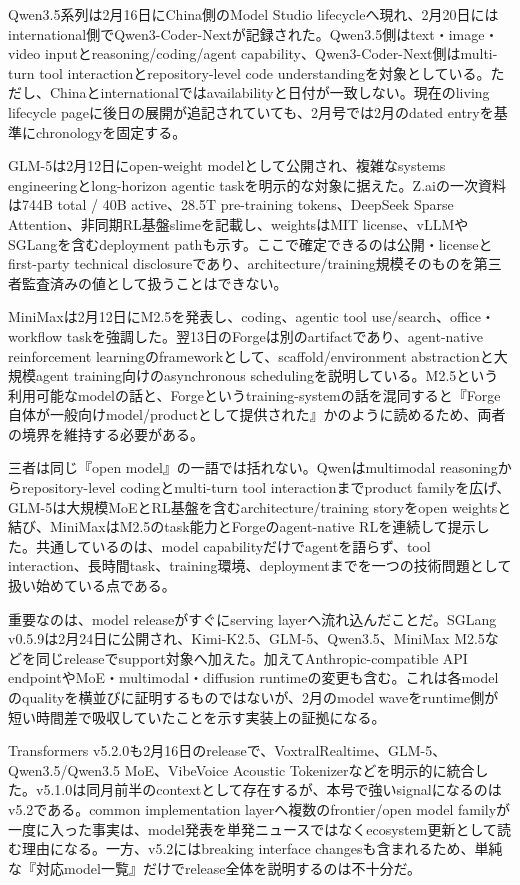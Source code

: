 Qwen3.5系列は2月16日にChina側のModel Studio lifecycleへ現れ、2月20日にはinternational側でQwen3-Coder-Nextが記録された。Qwen3.5側はtext・image・video inputとreasoning/coding/agent capability、Qwen3-Coder-Next側はmulti-turn tool interactionとrepository-level code understandingを対象としている。ただし、Chinaとinternationalではavailabilityと日付が一致しない。現在のliving lifecycle pageに後日の展開が追記されていても、2月号では2月のdated entryを基準にchronologyを固定する。\autocite{src-eac8dfbeb78c}


GLM-5は2月12日にopen-weight modelとして公開され、複雑なsystems engineeringとlong-horizon agentic taskを明示的な対象に据えた。Z.aiの一次資料は744B total / 40B active、28.5T pre-training tokens、DeepSeek Sparse Attention、非同期RL基盤slimeを記載し、weightsはMIT license、vLLMやSGLangを含むdeployment pathも示す。ここで確定できるのは公開・licenseとfirst-party technical disclosureであり、architecture/training規模そのものを第三者監査済みの値として扱うことはできない。\autocite{src-9156c37fb1c2}


MiniMaxは2月12日にM2.5を発表し、coding、agentic tool use/search、office・workflow taskを強調した。翌13日のForgeは別のartifactであり、agent-native reinforcement learningのframeworkとして、scaffold/environment abstractionと大規模agent training向けのasynchronous schedulingを説明している。M2.5という利用可能なmodelの話と、Forgeというtraining-systemの話を混同すると『Forge自体が一般向けmodel/productとして提供された』かのように読めるため、両者の境界を維持する必要がある。\autocite{src-d8e13386974c}


三者は同じ『open model』の一語では括れない。Qwenはmultimodal reasoningからrepository-level codingとmulti-turn tool interactionまでproduct familyを広げ、GLM-5は大規模MoEとRL基盤を含むarchitecture/training storyをopen weightsと結び、MiniMaxはM2.5のtask能力とForgeのagent-native RLを連続して提示した。共通しているのは、model capabilityだけでagentを語らず、tool interaction、長時間task、training環境、deploymentまでを一つの技術問題として扱い始めている点である。\autocite{src-9156c37fb1c2,src-d8e13386974c,src-eac8dfbeb78c}


重要なのは、model releaseがすぐにserving layerへ流れ込んだことだ。SGLang v0.5.9は2月24日に公開され、Kimi-K2.5、GLM-5、Qwen3.5、MiniMax M2.5などを同じreleaseでsupport対象へ加えた。加えてAnthropic-compatible API endpointやMoE・multimodal・diffusion runtimeの変更も含む。これは各modelのqualityを横並びに証明するものではないが、2月のmodel waveをruntime側が短い時間差で吸収していたことを示す実装上の証拠になる。\autocite{src-5bc0746a47c6}


Transformers v5.2.0も2月16日のreleaseで、VoxtralRealtime、GLM-5、Qwen3.5/Qwen3.5 MoE、VibeVoice Acoustic Tokenizerなどを明示的に統合した。v5.1.0は同月前半のcontextとして存在するが、本号で強いsignalになるのはv5.2である。common implementation layerへ複数のfrontier/open model familyが一度に入った事実は、model発表を単発ニュースではなくecosystem更新として読む理由になる。一方、v5.2にはbreaking interface changesも含まれるため、単純な『対応model一覧』だけでrelease全体を説明するのは不十分だ。\autocite{src-0bd04783f97b,src-a43d64987293}


